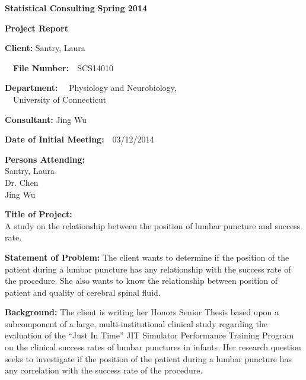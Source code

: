 \documentclass[12pt]{article}
\begin{document}

\begin{flushleft}{\bf Statistical Consulting}\hfill
                 {\bf Spring 2014}  %
\end{flushleft}

\begin{center}
 {\bf Project Report}
\end{center}

\vspace{.5cm}

\parbox{3.5in}{{\bf Client:} Santry, Laura  }\ \
              {{\bf File Number:}\ \ SCS14010 }

\vspace{.2cm}
\parbox{3.5in}{{\bf Department:} \ \ Physiology and Neurobiology, \\
                                  \ \ University of Connecticut}

\vspace{.2cm}
\parbox{3.5in}{{\bf Consultant:} Jing Wu\ \ }
              {{\bf Date of Initial Meeting:}\ \ 03/12/2014}

\vspace{.2cm} {\bf Persons Attending: }     \\  Santry, Laura   \ \  \\ Dr. Chen \ \ \\   Jing Wu\ \


\vspace{.2cm} {\bf Title of Project:} \\
A study on the relationship between the position of lumbar puncture and success rate.

\vspace{.5cm}

{\bf Statement of Problem:}
The client wants to determine if the position of the patient during a lumbar puncture has any relationship with the success rate of the procedure. She also wants to know the relationship between position of patient and quality of cerebral spinal fluid.

\vspace{.5cm}

{\bf Background:}
The client is writing her Honors Senior Thesis based upon a subcomponent of a large, multi-institutional clinical study regarding the evaluation of the “Just In Time” JIT Simulator Performance Training Program on the clinical success rates of lumbar punctures in infants. Her research question seeks to investigate if the position of the patient during a lumbar puncture has any correlation with the success rate of the procedure.
\end{document}
